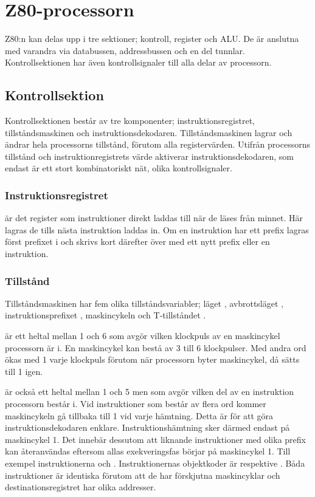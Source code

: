 \documentclass[main.tex]{subfiles}
\begin{document}
\section{Z80-processorn}
Z80:n kan delas upp i tre sektioner; kontroll, register och ALU. De är anslutna
med varandra via databussen, addressbussen och en del tunnlar.
Kontrollsektionen har även kontrollsignaler till alla delar av processorn.

\subsection{Kontrollsektion}
Kontrollsektionen består av tre komponenter; instruktionsregistret,
tillståndsmaskinen och instruktionsdekodaren. Tillståndsmaskinen lagrar och
ändrar hela processorns tillstånd, förutom alla registervärden. Utifrån
processorns tillstånd och instruktionregistrets värde aktiverar
instruktionsdekodaren, som endast är ett stort kombinatoriskt nät, olika
kontrollsignaler.

\subsubsection{Instruktionsregistret }
 är det register som instruktioner direkt laddas till när de läses
från minnet. Här lagras de tills nästa instruktion laddas in. Om en instruktion
har ett prefix lagras först prefixet i  och skrivs kort därefter över
med ett nytt prefix eller en instruktion.

\subsubsection{Tillstånd}
Tillståndsmaskinen har fem olika tillståndsvariabler; läget ,
avbrottsläget , instruktionsprefixet , maskincykeln
 och T-tillståndet .

 är ett heltal mellan 1 och 6 som avgör vilken klockpuls av en
maskincykel processorn är i. En maskincykel kan bestå av 3 till 6 klockpulser.
Med andra ord ökas  med 1 varje klockpuls förutom när processorn byter
maskincykel, då sätts  till 1 igen.

 är också ett heltal mellan 1 och 5 men som avgör vilken del av en
instruktion processorn består i. Vid instruktioner som består av flera ord
kommer maskincykeln gå tillbaka till 1 vid varje hämtning. Detta är för att
göra instruktionsdekodaren enklare. Instruktionshämtning sker därmed endast på
maskincykel 1. Det innebär dessutom att liknande instruktioner med olika prefix
kan återanvändas eftersom allas exekveringsfas börjar på maskincykel 1. Till
exempel instruktionerna  och .
Instruktionernas objektkoder är  respektive . Båda instruktioner är
identiska förutom att de har förskjutna maskincyklar och destinationsregistret
har olika addresser.
\end{document}

